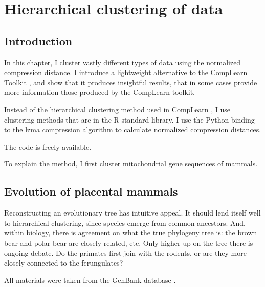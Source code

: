 
\chapter{Hierarchical clustering of data}

\label{Chapter3} %


\section{Introduction}

In this chapter, I cluster vastly different types of data using the
normalized compression distance. I introduce a lightweight alternative to
the CompLearn Toolkit \cite{CompLearn}, and show that it produces insightful results, that in some cases provide more information those produced by the CompLearn toolkit.

Instead of the hierarchical clustering method used in CompLearn
\cite{Cilibrasi2011}, I use clustering methods that are in the R standard
library. I use the Python binding to the lzma compression algorithm to
calculate normalized compression distances.

The code \cite{ClusteringGithub} is freely available.

To explain the method, I first cluster mitochondrial gene sequences of
mammals.

\section{Evolution of placental mammals}

Reconstructing an evolutionary tree has intuitive appeal. It should lend
itself well to hierarchical clustering, since species emerge from common
ancestors. And, within biology, there is agreement on what the true
phylogeny tree is: the brown bear and polar bear are closely related, etc.
Only higher up on the tree there is ongoing debate. Do the primates first
join with the rodents, or are they more closely connected to the
ferungulates? 

All materials were taken from the GenBank database \cite{GenBank}.

